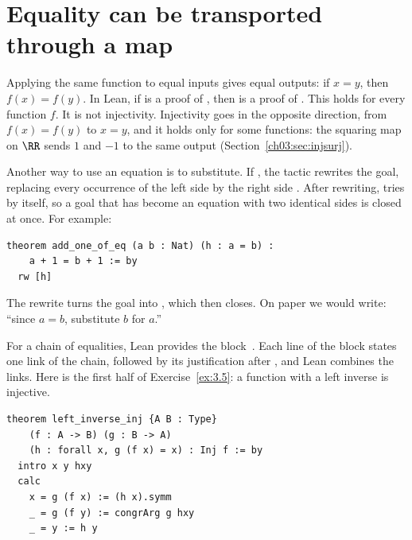 \section{Equality can be transported through a map}\label{ch15:sec:equality}
Applying the same function to equal inputs gives equal outputs: if $x=y$, then $f(x)=f(y)$. In Lean, if  is a proof of , then  is a proof of . This holds for every function $f$. It is not injectivity. Injectivity goes in the opposite direction, from $f(x)=f(y)$ to $x=y$, and it holds only for some functions: the squaring map on $\RR$ sends $1$ and $-1$ to the same output (Section~\ref{ch03:sec:injsurj}).

Another way to use an equation is to substitute. If , the tactic  rewrites the goal, replacing every occurrence of the left side  by the right side . After rewriting,  tries  by itself, so a goal that has become an equation with two identical sides is closed at once. For example:
\par\noindent\begin{minipage}{\linewidth}
\begin{lstlisting}
theorem add_one_of_eq (a b : Nat) (h : a = b) :
    a + 1 = b + 1 := by
  rw [h]
\end{lstlisting}
\end{minipage}\par
The rewrite turns the goal  into , which  then closes. On paper we would write: ``since $a=b$, substitute $b$ for $a$.''

For a chain of equalities, Lean provides the  block~\cite{leanquant}. Each line of the block states one link of the chain, followed by its justification after \code{:=}, and Lean combines the links. Here is the first half of Exercise~\ref{ex:3.5}: a function with a left inverse is injective.
\par\noindent\begin{minipage}{\linewidth}
\begin{lstlisting}
theorem left_inverse_inj {A B : Type}
    (f : A -> B) (g : B -> A)
    (h : forall x, g (f x) = x) : Inj f := by
  intro x y hxy
  calc
    x = g (f x) := (h x).symm
    _ = g (f y) := congrArg g hxy
    _ = y := h y
\end{lstlisting}
\end{minipage}\par


